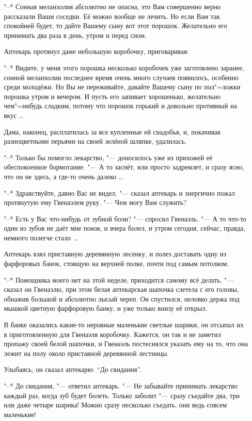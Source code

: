 "--* Сонная меланхолия абсолютно не опасна, это Вам совершенно верно рассказали
Ваши соседки.
Её можно вообще не лечить.
Но если Вам так спокойней будет, то дайте Вашему сыну вот этот порошок.
Желательно его принимать два раза в день, утром и перед сном.

Аптекарь протянул даме небольшую коробочку, приговаривая:

"--* Видите, у меня этого порошка несколько коробочек уже заготовлено заранее,
сонной меланхолии последнее время очень много случаев появилось, особенно среди
молодёжи.
Но Вы не переживайте, давайте Вашему сыну по пол"=ложки порошка утром и
вечером.
И пусть его запивает хорошенько, желательно чем"=нибудь сладким, потому что
порошок горький и довольно противный на вкус \ldots

Дама, наконец, расплатилась за все купленные ей снадобья, и, покачивая
разноцветными перьями на своей зелёной шляпке, удалилась.

"--* Только бы помогло лекарство, "--- доносилось уже из прихожей её
обеспокоенное бормотание.
"--- А то заснёт, или просто задремлет, и сразу ясно, что он не здесь, а где-то
очень далеко \ldots

"--* Здравствуйте, давно Вас не видел, "--- сказал аптекарь и энергично пожал
протянутую ему Гвенаэлем руку.
"--- Чем могу Вам служить?

"--* Есть у Вас что-нибудь от зубной боли? "--- спросил Гвенаэль.
"--- А то что-то один из зубов не даёт мне покоя, и вчера болел, и утром сегодня,
сейчас, правда, немного полегче стало \ldots

Аптекарь взял приставную деревянную лесенку, и полез доставать одну из
фарфоровых банок, стоящую на верхней полке, почти под самым потолком.

"--* Помощника моего нет на этой неделе, приходится самому всё делать, "---
сказал он Гвенаэлю, при этом белая аптекарская шапочка слетела с его головы,
обнажив большой и абсолютно лысый череп.
Он спустился, неловко держа под мышкой цветную фарфоровую банку, и уже только
внизу её открыл.

В банке оказались какие-то неровные маленькие светлые шарики, он отсыпал их в
приготовленную для Гвенаэля коробочку.
Кажется, он так и не заметил пропажу своей белой шапочки, и Гвенаэль постеснялся
указать ему на то, что она лежит на полу около приставной деревянной лестницы.

Улыбаясь, он сказал аптекарю: \enquote{До свидания}.

"--* До свидания, "--- ответил аптекарь.
"--- Не забывайте принимать лекарство каждый раз, когда зуб будет болеть.
Только заболит "--- сразу съедайте два, три или даже четыре шарика!
Можно сразу несколько съедать, они ведь совсем маленькие!

